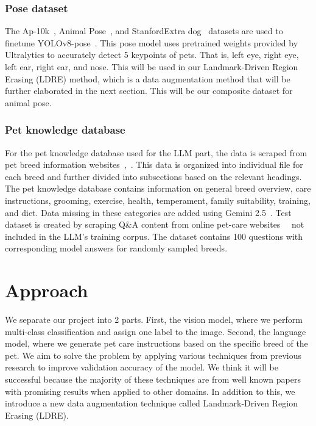 \documentclass[10pt,twocolumn,letterpaper]{article}
\begin{document}
\subsubsection{Pose dataset}
The Ap-10k~\cite{yu2021ap}, Animal Pose~\cite{Cao_2019_ICCV}, and StanfordExtra dog~\cite{biggs2020left} datasets are used to finetune YOLOv8-pose~\cite{yolov8_ultralytics}. This pose model uses pretrained weights provided by Ultralytics to accurately detect 5 keypoints of pets. That is, left eye, right eye, left ear, right ear, and nose. This will be used in our Landmark-Driven Region Erasing (LDRE) method, which is a data augmentation method that will be further elaborated in the next section. This will be our composite dataset for animal pose.

\subsubsection{Pet knowledge database}
For the pet knowledge database used for the LLM part, the data is scraped from pet breed information websites~\cite{dog-breeds-net},~\cite{wisdom-panel-cat}. This data is organized into individual file for each breed and further divided into subsections based on the relevant headings. The pet knowledge database contains information on general breed overview, care instructions, grooming, exercise, health, temperament, family suitability, training, and diet. Data missing in these categories are added using Gemini 2.5~\cite{gemini2.5}. Test dataset is created by scraping Q\&A content from online pet-care websites~\cite{everypaw-dog}~\cite{everypaw-cat} not included in the LLM’s training corpus. The dataset contains 100 questions with corresponding model answers for randomly sampled breeds.

\section{Approach}

We separate our project into 2 parts. First, the vision model, where we perform multi-class classification and assign one label to the image. Second, the language model, where we generate pet care instructions based on the specific breed of the pet. We aim to solve the problem by applying various techniques from previous research to improve validation accuracy of the model. We think it will be successful because the majority of these techniques are from well known papers with promising results when applied to other domains. In addition to this, we introduce a new data augmentation technique called Landmark-Driven Region Erasing (LDRE).
\end{document}
